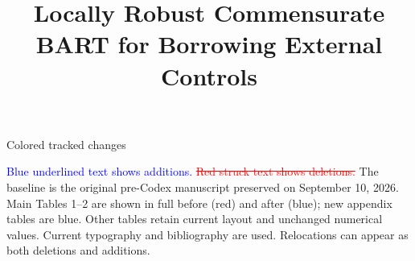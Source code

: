 \documentclass[11pt]{article}
\theoremstyle{definition}
\theoremstyle{plain}
\begin{document}
\sloppy
\begin{center}\Large Colored tracked changes\end{center}
\noindent\textcolor{blue}{Blue underlined text shows additions.}
\textcolor{red}{\sout{Red struck text shows deletions.}}
The baseline is the original pre-Codex manuscript preserved on September 10, 2026. Main Tables 1--2 are shown in full before (red) and after (blue); new appendix tables are blue. Other tables retain current layout and unchanged numerical values.
Current typography and bibliography are used. Relocations can appear as both deletions and additions.
\clearpage

%

\providecommand{\SIMRESULT}[1]{\textbf{[SIM:\ #1]}}

\title{Locally Robust Commensurate BART for Borrowing External Controls}
\author{}
\date{}
\maketitle
\end{document}
